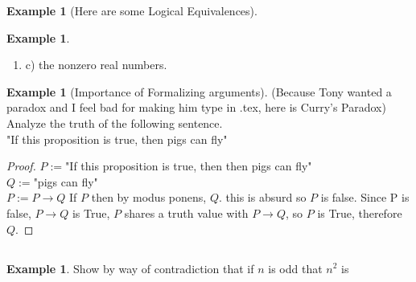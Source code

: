 \documentclass[letterpaper,10pt]{article}
\theoremstyle{plain}
\theoremstyle{definition}
\newtheorem{exmp}[thm]{Example}
\theoremstyle{remark}
\providecommand{\land}{\ensuremath{\wedge}}
\providecommand{\lor}{\ensuremath{\vee}}
\begin{document}
\begin{exmp}[Here are some Logical Equivalences]
\begin{exmp}
\begin{enumerate}
\begin{proof}
\end{proof}
\noindent
\item c) the nonzero real numbers.
\vspace{3cm}
\newline
\end{enumerate}
\end{exmp}
\vspace{3cm}

\begin{exmp}[Importance of Formalizing arguments]
(Because Tony wanted a paradox and I feel bad for making him type in .tex, here is Curry's Paradox)\\

Analyze the truth of the following sentence.\\

"If this proposition is true, then pigs can fly"\\
\begin{proof}
$P:=$"If this proposition is true, then then pigs can fly"\\
$Q:=$"pigs can fly"\\
$P:=P\to Q$
If $P$ then by modus ponens, $Q$. this is absurd so $P$ is false. Since P is false, $P\to Q$ is True, $P$ shares a truth value with $P\to Q$, so $P$ is True, therefore $Q$.
\end{proof}

\newpage
\subsection{}
\begin{exmp}
Show by way of contradiction that if $n$ is odd that $n^2$ is 
\begin{align}

\end{align}
\end{exmp}

\end{exmp}








\end{exmp}
\end{document}
